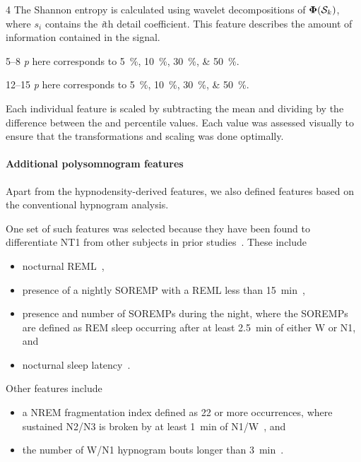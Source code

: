 \begin{table}[t]
\begin{adjustwidth*}{}{}
\begin{threeparttable}
\begin{tabular}{@{}llc@{}}
        \bottomrule
    \end{tabular}
    \begin{tablenotes}
        \small
        \item[4] The Shannon entropy is calculated using wavelet decompositions of \( \func{\boldsymbol{\Phi}}{\mathcal{S}_{k}} \), where \(s_i\) contains the \textit{i}th detail coefficient. This feature describes the amount of information contained in the signal.
        \item[5--8] \textit{p} here corresponds to \SIlist{5;10;30;50}{\percent}. 
        \item[12--15] \textit{p} here corresponds to \SIlist{5;10;30;50}{\percent}. 
        \item Each individual feature is scaled by subtracting the mean and dividing by the difference between the  and  percentile values.
        Each value was assessed visually to ensure that the transformations and scaling was done optimally.
    \end{tablenotes}
\end{threeparttable}
\end{adjustwidth*}
\end{table}

\paragraph{Additional polysomnogram features}
Apart from the hypnodensity-derived features, we also defined features based on the conventional hypnogram analysis.

One set of such features was selected because they have been found to differentiate \ac{NT1} from other subjects in prior studies~\cite{Christensen2015a,Roth2013,Hansen2017,Drakatos2013,Liu2015b}. 
These include
\begin{itemize}
    \item nocturnal \ac{REML}~\cite{Andlauer2013},
    \item presence of a nightly \ac{SOREMP} with a \ac{REML} less than \SI{15}{\minute}~\cite{Andlauer2013},
    \item presence and number of \acp{SOREMP} during the night, where the \acp{SOREMP} are defined as \ac{REM} sleep occurring after at least \SI{2.5}{\minute} of either \ac{W} or \ac{N1}, and
    \item nocturnal sleep latency~\cite{Christensen2015a}.
\end{itemize}
Other features include 
\begin{itemize}
    \item a \ac{NREM} fragmentation index defined as 22 or more occurrences, where sustained \ac{N2}/\ac{N3} is broken by at least \SI{1}{\minute} of \ac{N1}/\ac{W}~\cite{Christensen2015a}, and
    \item the number of \ac{W}/\ac{N1} hypnogram bouts longer than \SI{3}{\minute}~\cite{Christensen2015a}.
\end{itemize}

